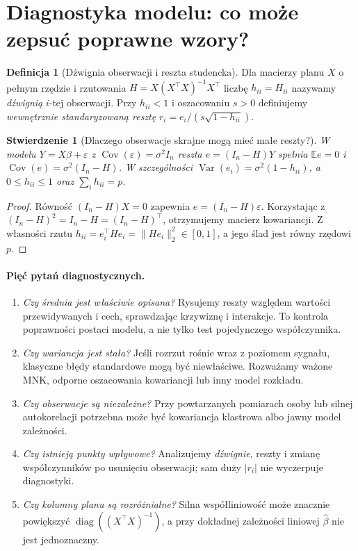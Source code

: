 \documentclass[11pt,a4paper,oneside]{report}
\numberwithin{equation}{chapter}
\theoremstyle{plain}
\newtheorem{stwierdzenie}[twierdzenie]{Stwierdzenie}
\theoremstyle{definition}
\newtheorem{definicja}{Definicja}[chapter]
\theoremstyle{remark}
\newcommand{\E}{\mathbb E}
\newcommand{\Var}{\operatorname{Var}}
\newcommand{\Cov}{\operatorname{Cov}}
\begin{document}
\section{Diagnostyka modelu: co może zepsuć poprawne wzory?}
\begin{definicja}[Dźwignia obserwacji i reszta studencka]
Dla macierzy planu $X$ o pełnym rzędzie i rzutowania
$H=X(X^\top X)^{-1}X^\top$ liczbę $h_{ii}=H_{ii}$
nazywamy \emph{dźwignią} $i$-tej obserwacji.
Przy $h_{ii}<1$ i oszacowaniu $s>0$ definiujemy
\emph{wewnętrznie standaryzowaną resztę}
$r_i=e_i/(s\sqrt{1-h_{ii}})$.
\end{definicja}

\begin{stwierdzenie}[Dlaczego obserwacje skrajne mogą mieć małe reszty?]
W modelu $Y=X\beta+\varepsilon$ z
$\Cov(\varepsilon)=\sigma^2I_n$ reszta $e=(I_n-H)Y$
spełnia $\E e=0$ i
$\Cov(e)=\sigma^2(I_n-H)$.
W szczególności $\Var(e_i)=\sigma^2(1-h_{ii})$,
a $0\le h_{ii}\le1$ oraz $\sum_ih_{ii}=p$.
\end{stwierdzenie}
\begin{proof}
Równość $(I_n-H)X=0$ zapewnia
$e=(I_n-H)\varepsilon$. Korzystając z
$(I_n-H)^2=I_n-H=(I_n-H)^\top$,
otrzymujemy macierz kowariancji. Z własności rzutu
$h_{ii}=e_i^\top He_i=\|He_i\|_2^2\in[0,1]$,
a jego ślad jest równy rzędowi $p$.
\end{proof}

\paragraph{Pięć pytań diagnostycznych.}
\begin{enumerate}
\item \emph{Czy średnia jest właściwie opisana?}
Rysujemy reszty względem wartości przewidywanych i cech,
sprawdzając krzywiznę i interakcje. To kontrola poprawności
postaci modelu, a nie tylko test pojedynczego współczynnika.
\item \emph{Czy wariancja jest stała?} Jeśli rozrzut rośnie
wraz z poziomem sygnału, klasyczne błędy standardowe mogą być
niewłaściwe. Rozważamy ważone MNK, odporne oszacowania
kowariancji lub inny model rozkładu.
\item \emph{Czy obserwacje są niezależne?} Przy powtarzanych
pomiarach osoby lub silnej autokorelacji potrzebna może być
kowariancja klastrowa albo jawny model zależności.
\item \emph{Czy istnieją punkty wpływowe?} Analizujemy
\emph{dźwignie}, reszty i zmianę współczynników po usunięciu
obserwacji; sam duży $|r_i|$ nie wyczerpuje diagnostyki.
\item \emph{Czy kolumny planu są rozróżnialne?}
Silna współliniowość może znacznie powiększyć
$\operatorname{diag}((X^\top X)^{-1})$, a przy dokładnej
zależności liniowej $\widehat\beta$ nie jest jednoznaczny.
\end{enumerate}
\end{document}
